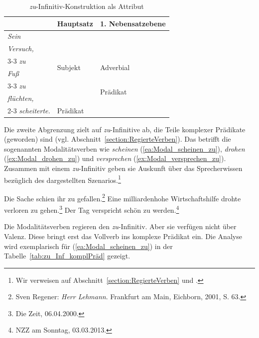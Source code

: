 \begin{table}[t]
  \centering
  \begin{tabular}{l|l|l}
       &  Hauptsatz   &  1. Nebensatzebene \\
    \hline
    \textit{Sein} & \multirow{6}{*}{Subjekt}  & \\ 
    \textit{Versuch,} &  & \\ \cline{3-3} 
    \textit{zu} & & \multirow{2}{*}{Adverbial} \\   
    \textit{Fuß} & & \\ \cline{3-3} \cline{3-3}
    \textit{zu} &  & \multirow{2}{*}{Prädikat} \\ 
    \textit{flüchten,} & & \\ \cline{2-3} 
    \textit{scheiterte.} & Prädikat & \\ 
    \hline 
  \end{tabular}
  \caption{\textit{zu}-Infinitiv-Konstruktion als Attribut}
  \label{tab:zu_Inf_Attribut}
\end{table}

Die zweite Abgrenzung zielt auf \textit{zu}-Infinitive ab, die Teile komplexer Prädikate (geworden) sind (vgl. Abschnitt~\ref{section:RegierteVerben}). Das betrifft die sogenannten Modalitätsverben wie \textit{scheinen} (\ref{ea:Modal_scheinen_zu}), \textit{drohen} (\ref{ex:Modal_drohen_zu}) und \textit{versprechen} (\ref{ex:Modal_versprechen_zu}). Zusammen mit einem \textit{zu}-Infinitiv geben sie Auskunft über das Sprecherwissen bezüglich des dargestellten Szenarios.\footnote{Wir verweisen auf Abschnitt~\ref{section:RegierteVerben} und \citet[236]{Diewald2004}.} 

\newpage
\ea \label{ea:Modalität_zu_Inf}
\ea \label{ea:Modal_scheinen_zu} Die Sache schien ihr zu gefallen.\footnote{Sven Regener: \textit{Herr Lehmann}. Frankfurt am Main, Eichborn, 2001, S. 63.} 
\ex \label{ex:Modal_drohen_zu} Eine milliardenhohe Wirtschaftshilfe drohte verloren zu gehen.\footnote{Die Zeit, 06.04.2000.} 
\ex \label{ex:Modal_versprechen_zu} Der Tag verspricht schön zu werden.\footnote{NZZ am Sonntag, 03.03.2013.}
\z 
\z 

Die Modalitätsverben regieren den \textit{zu}-Infinitiv. Aber sie verfügen nicht über Valenz. Diese bringt erst das Vollverb ins komplexe Prädikat ein. Die Analyse wird exemplarisch für (\ref{ea:Modal_scheinen_zu}) in der Tabelle~\ref{tab:zu_Inf_komplPräd} gezeigt.

